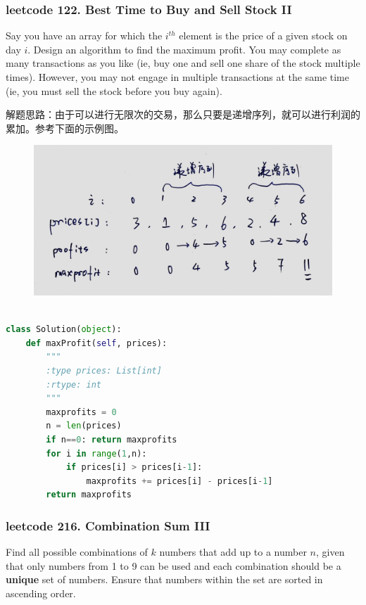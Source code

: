 \documentclass[a4paper,10pt]{article}
\begin{document}
\subsubsection{leetcode 122. Best Time to Buy and Sell Stock II}
Say you have an array for which the $i^{th}$ element is the price of a given stock on day $i$. Design an algorithm to find the maximum profit. You may complete as many transactions as you like (ie, buy one and sell one share of the stock multiple times). However, you may not engage in multiple transactions at the same time (ie, you must sell the stock before you buy again). \\

\begin{CJK*}{UTF8}{gbsn}
\noindent 解题思路：由于可以进行无限次的交易，那么只要是递增序列，就可以进行利润的累加。参考下面的示例图。
\end{CJK*}

\begin{figure}[h]
    \includegraphics[width=\textwidth]{leetcode122.jpg}
    \centering \\
\end{figure}

\begin{lstlisting}[language=Python, caption=Problem122. Best Time to Buy and Sell Stock II]

class Solution(object):
    def maxProfit(self, prices):
        """
        :type prices: List[int]
        :rtype: int
        """
        maxprofits = 0
        n = len(prices)
        if n==0: return maxprofits
        for i in range(1,n):
            if prices[i] > prices[i-1]:
                maxprofits += prices[i] - prices[i-1]
        return maxprofits
\end{lstlisting}


\subsubsection{leetcode 216. Combination Sum III}
Find all possible combinations of $k$ numbers that add up to a number $n$, given that only numbers from 1 to 9 can be used and each combination should be a \textbf{unique} set of numbers. Ensure that numbers within the set are sorted in ascending order.
\end{document}
